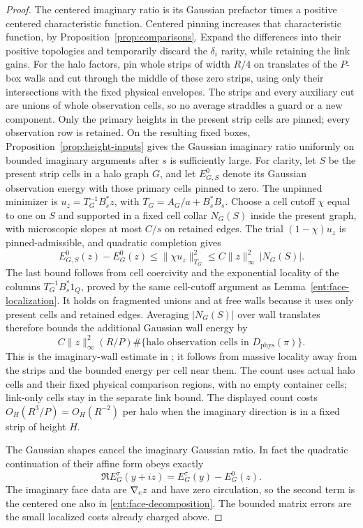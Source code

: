 \begin{proof}
The centered imaginary ratio is its Gaussian prefactor
times a positive centered characteristic function.
Centered pinning increases that characteristic function,
by Proposition~\ref{prop:comparisons}.  Expand the
differences into their positive topologies and temporarily
discard the \(\delta_i\) rarity, while retaining the link
gains.  For the halo factors, pin whole strips of width \(R/4\) on translates
of the \(P\)-box walls and cut through the middle of
these zero strips, using only their intersections with the fixed
physical envelopes.  The strips and every auxiliary cut
are unions of whole observation cells, so no average
straddles a guard or a new component.  Only the primary heights in
the present strip cells are pinned; every observation row is retained.
On the resulting
fixed boxes, Proposition~\ref{prop:height-inputs} gives
the Gaussian imaginary ratio uniformly on bounded
imaginary arguments after \(s\) is sufficiently large.
For clarity, let \(S\) be the present strip cells in a halo graph
\(G\), and let \(E_{G,S}^0\) denote its Gaussian observation energy
with those primary cells pinned to zero.  The unpinned minimizer is
\(u_z=T_G^{-1}B_s^*z\), with \(T_G=A_G/a+B_s^*B_s\).
Choose a cell cutoff \(\chi\) equal to one on \(S\) and supported
in a fixed cell collar \(N_G(S)\) inside the present graph, with
microscopic slopes at most \(C/s\) on retained edges.
The trial \((1-\chi)u_z\) is pinned-admissible, and quadratic
completion gives
\[
 E_{G,S}^0(z)-E_G^0(z)
       \le \|\chi u_z\|_{T_G}^2
       \le C\|z\|_\infty^2\,|N_G(S)|.
\]
The last bound follows from cell coercivity and the exponential
locality of the columns \(T_G^{-1}B_s^*1_Q\), proved by the same
cell-cutoff argument as Lemma~\ref{ent:face-localization}.  It holds
on fragmented unions and at free walls because it uses only present
cells and retained edges.  Averaging \(|N_G(S)|\) over wall
translates therefore bounds the additional Gaussian wall energy by
\[
       C\|z\|_\infty^2(R/P)
       \#\{\text{halo observation cells in }D_{\mathrm{phys}}(\pi)\}.
\]
This is the imaginary-wall estimate in
\cite[Equation~(9.31)]{B}; it follows from massive
locality away from the strips and the bounded energy
per cell near them.  The count uses actual halo cells and their fixed
physical comparison regions, with no empty container cells; link-only
cells stay in the separate link bound.  The displayed count costs \(O_H(R^3/P)=O_H(R^{-2})\)
per halo when the imaginary direction is in a fixed
strip of height \(H\).

The Gaussian shapes cancel the imaginary Gaussian ratio.
In fact the quadratic continuation of their affine form obeys exactly
\begin{equation}\label{ent:imaginary-shape}
          \Re E_G^\tau(y+iz)=E_G^\tau(y)-E_G^0(z).
\end{equation}
The imaginary face data are \(\nabla_{\rm c}z\) and
have zero circulation, so the second term is the centered
one also in \eqref{ent:face-decomposition}.  The bounded
matrix errors are the small localized costs already
charged above.


\end{proof}
